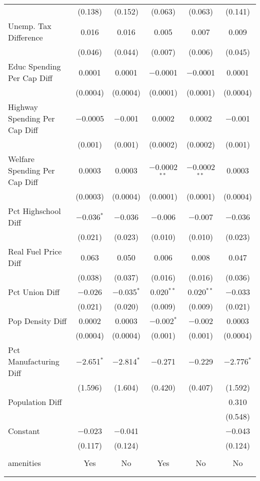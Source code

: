 \begin{table}[!htbp]
\begin{tabular}{@{\extracolsep{5pt}}lccccc}
  & (0.138) & (0.152) & (0.063) & (0.063) & (0.141) \\ 
  Unemp. Tax Difference & 0.016 & 0.016 & 0.005 & 0.007 & 0.009 \\ 
  & (0.046) & (0.044) & (0.007) & (0.006) & (0.045) \\ 
  Educ Spending Per Cap Diff & 0.0001 & 0.0001 & $-$0.0001 & $-$0.0001 & 0.0001 \\ 
  & (0.0004) & (0.0004) & (0.0001) & (0.0001) & (0.0004) \\ 
  Highway Spending Per Cap Diff & $-$0.0005 & $-$0.001 & 0.0002 & 0.0002 & $-$0.001 \\ 
  & (0.001) & (0.001) & (0.0002) & (0.0002) & (0.001) \\ 
  Welfare Spending Per Cap Diff & 0.0003 & 0.0003 & $-$0.0002$^{**}$ & $-$0.0002$^{**}$ & 0.0003 \\ 
  & (0.0003) & (0.0004) & (0.0001) & (0.0001) & (0.0004) \\ 
  Pct Highschool Diff & $-$0.036$^{*}$ & $-$0.036 & $-$0.006 & $-$0.007 & $-$0.036 \\ 
  & (0.021) & (0.023) & (0.010) & (0.010) & (0.023) \\ 
  Real Fuel Price Diff & 0.063 & 0.050 & 0.006 & 0.008 & 0.047 \\ 
  & (0.038) & (0.037) & (0.016) & (0.016) & (0.036) \\ 
  Pct Union Diff & $-$0.026 & $-$0.035$^{*}$ & 0.020$^{**}$ & 0.020$^{**}$ & $-$0.033 \\ 
  & (0.021) & (0.020) & (0.009) & (0.009) & (0.021) \\ 
  Pop Density Diff & 0.0002 & 0.0003 & $-$0.002$^{*}$ & $-$0.002 & 0.0003 \\ 
  & (0.0004) & (0.0004) & (0.001) & (0.001) & (0.0004) \\ 
  Pct Manufacturing Diff & $-$2.651$^{*}$ & $-$2.814$^{*}$ & $-$0.271 & $-$0.229 & $-$2.776$^{*}$ \\ 
  & (1.596) & (1.604) & (0.420) & (0.407) & (1.592) \\ 
  Population Diff &  &  &  &  & 0.310 \\ 
  &  &  &  &  & (0.548) \\ 
  Constant & $-$0.023 & $-$0.041 &  &  & $-$0.043 \\ 
  & (0.117) & (0.124) &  &  & (0.124) \\ 
 \hline \\[-1.8ex] 
amenities & Yes & No & Yes & No & No \\ 
\hline \\[-1.8ex] 
\hline 
\hline \\[-1.8ex] 
\end{tabular} 
\end{table} 
